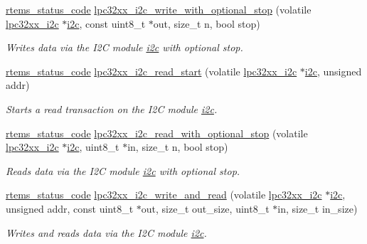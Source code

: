 \begin{DoxyCompactItemize}
\mbox{\hyperlink{group__ClassicStatus_ga545d41846817eaba6143d52ee4d9e9fe}{rtems\+\_\+status\+\_\+code}} \mbox{\hyperlink{group__lpc32xx__i2c_gaa9648954851cae9bfb3a08716c2f8e99}{lpc32xx\+\_\+i2c\+\_\+write\+\_\+with\+\_\+optional\+\_\+stop}} (volatile \mbox{\hyperlink{structlpc32xx__i2c}{lpc32xx\+\_\+i2c}} $\ast$\mbox{\hyperlink{structi2c}{i2c}}, const uint8\+\_\+t $\ast$out, size\+\_\+t n, bool stop)
\begin{DoxyCompactList}\small\item\em Writes data via the I2C module {\itshape \mbox{\hyperlink{structi2c}{i2c}}} with optional stop. \end{DoxyCompactList}\item 
\mbox{\hyperlink{group__ClassicStatus_ga545d41846817eaba6143d52ee4d9e9fe}{rtems\+\_\+status\+\_\+code}} \mbox{\hyperlink{group__lpc32xx__i2c_ga433964f434e60b0daad5ba8bdbde18d8}{lpc32xx\+\_\+i2c\+\_\+read\+\_\+start}} (volatile \mbox{\hyperlink{structlpc32xx__i2c}{lpc32xx\+\_\+i2c}} $\ast$\mbox{\hyperlink{structi2c}{i2c}}, unsigned addr)
\begin{DoxyCompactList}\small\item\em Starts a read transaction on the I2C module {\itshape \mbox{\hyperlink{structi2c}{i2c}}}. \end{DoxyCompactList}\item 
\mbox{\hyperlink{group__ClassicStatus_ga545d41846817eaba6143d52ee4d9e9fe}{rtems\+\_\+status\+\_\+code}} \mbox{\hyperlink{group__lpc32xx__i2c_ga5629b64177b57968d83d488db11e069c}{lpc32xx\+\_\+i2c\+\_\+read\+\_\+with\+\_\+optional\+\_\+stop}} (volatile \mbox{\hyperlink{structlpc32xx__i2c}{lpc32xx\+\_\+i2c}} $\ast$\mbox{\hyperlink{structi2c}{i2c}}, uint8\+\_\+t $\ast$in, size\+\_\+t n, bool stop)
\begin{DoxyCompactList}\small\item\em Reads data via the I2C module {\itshape \mbox{\hyperlink{structi2c}{i2c}}} with optional stop. \end{DoxyCompactList}\item 
\mbox{\hyperlink{group__ClassicStatus_ga545d41846817eaba6143d52ee4d9e9fe}{rtems\+\_\+status\+\_\+code}} \mbox{\hyperlink{group__lpc32xx__i2c_gae8c310236bd74e78bb02fe0e0c3c9f5e}{lpc32xx\+\_\+i2c\+\_\+write\+\_\+and\+\_\+read}} (volatile \mbox{\hyperlink{structlpc32xx__i2c}{lpc32xx\+\_\+i2c}} $\ast$\mbox{\hyperlink{structi2c}{i2c}}, unsigned addr, const uint8\+\_\+t $\ast$out, size\+\_\+t out\+\_\+size, uint8\+\_\+t $\ast$in, size\+\_\+t in\+\_\+size)
\begin{DoxyCompactList}\small\item\em Writes and reads data via the I2C module {\itshape \mbox{\hyperlink{structi2c}{i2c}}}. \end{DoxyCompactList}\end{DoxyCompactItemize}
